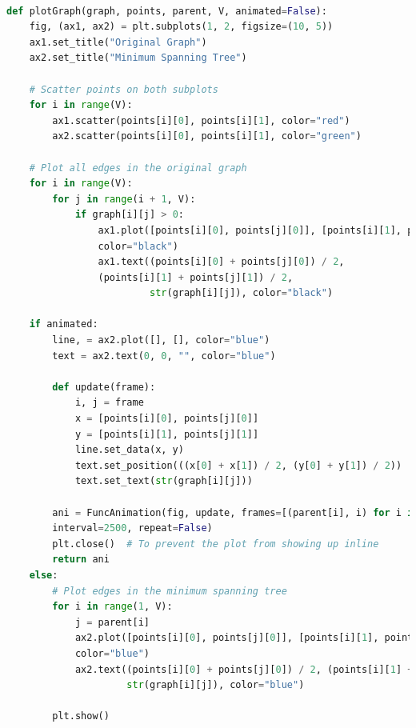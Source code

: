 \documentclass[a4paper, 10pt, twocolumn]{article}
\begin{document}
\begin{lstlisting}[language=Python, caption={Python code to display graph and MST}]

def plotGraph(graph, points, parent, V, animated=False):
    fig, (ax1, ax2) = plt.subplots(1, 2, figsize=(10, 5))
    ax1.set_title("Original Graph")
    ax2.set_title("Minimum Spanning Tree")

    # Scatter points on both subplots
    for i in range(V):
        ax1.scatter(points[i][0], points[i][1], color="red")
        ax2.scatter(points[i][0], points[i][1], color="green")

    # Plot all edges in the original graph
    for i in range(V):
        for j in range(i + 1, V):
            if graph[i][j] > 0:
                ax1.plot([points[i][0], points[j][0]], [points[i][1], points[j][1]], 
                color="black")
                ax1.text((points[i][0] + points[j][0]) / 2, 
                (points[i][1] + points[j][1]) / 2,
                         str(graph[i][j]), color="black")

    if animated:
        line, = ax2.plot([], [], color="blue")
        text = ax2.text(0, 0, "", color="blue")

        def update(frame):
            i, j = frame
            x = [points[i][0], points[j][0]]
            y = [points[i][1], points[j][1]]
            line.set_data(x, y)
            text.set_position(((x[0] + x[1]) / 2, (y[0] + y[1]) / 2))
            text.set_text(str(graph[i][j]))

        ani = FuncAnimation(fig, update, frames=[(parent[i], i) for i in range(1, V)], 
        interval=2500, repeat=False)
        plt.close()  # To prevent the plot from showing up inline
        return ani
    else:
        # Plot edges in the minimum spanning tree
        for i in range(1, V):
            j = parent[i]
            ax2.plot([points[i][0], points[j][0]], [points[i][1], points[j][1]], 
            color="blue")
            ax2.text((points[i][0] + points[j][0]) / 2, (points[i][1] + points[j][1]) / 2,
                     str(graph[i][j]), color="blue")

        plt.show()
\end{lstlisting}
\newpage
\end{document}
